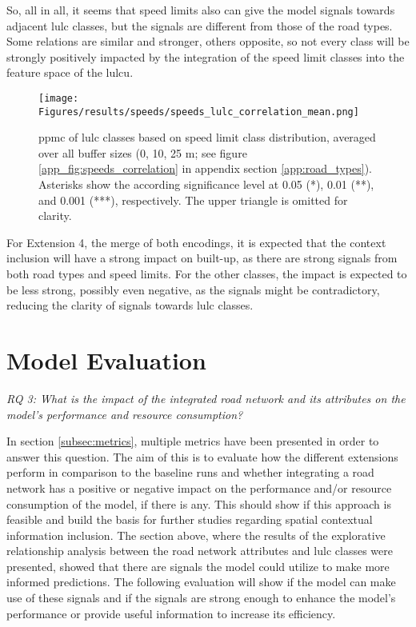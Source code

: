 So, all in all, it seems that speed limits also can give the model signals towards adjacent \gls{lulc} classes, but the signals are different from those of the road types. Some relations are similar and stronger, others opposite, so not every class will be strongly positively impacted by the integration of the speed limit classes into the feature space of the \gls{lulcu}.

\begin{figure}[htb]
    \centering
    \texttt{[image: Figures/results/speeds/speeds\_lulc\_correlation\_mean.png]}
    \caption[ of  Classes Based on Speed Limit Classes]{\gls{ppmc} of \gls{lulc} classes based on speed limit class distribution, averaged over all buffer sizes (0, 10, 25 m; see figure \ref{app_fig:speeds_correlation} in appendix section \ref{app:road_types}). Asterisks show the according significance level at 0.05 (*), 0.01 (**), and 0.001 (***), respectively. The upper triangle is omitted for clarity.}
    \label{fig:pmcc_speeds_mean}
\end{figure}

For Extension 4, the merge of both encodings, it is expected that the context inclusion will have a strong impact on built-up, as there are strong signals from both road types and speed limits. For the other classes, the impact is expected to be less strong, possibly even negative, as the signals might be contradictory, reducing the clarity of signals towards \gls{lulc} classes.

\section{Model Evaluation}

\emph{RQ 3: What is the impact of the integrated road network and its attributes on the model's performance and resource consumption?}

In section \ref{subsec:metrics}, multiple metrics have been presented in order to answer this question. The aim of this is to evaluate how the different extensions perform in comparison to the baseline runs and whether integrating a road network has a positive or negative impact on the performance and/or resource consumption of the model, if there is any. This should show if this approach is feasible and build the basis for further studies regarding spatial contextual information inclusion. The section above, where the results of the explorative relationship analysis between the road network attributes and \gls{lulc} classes were presented, showed that there are signals the model could utilize to make more informed predictions. The following evaluation will show if the model can make use of these signals and if the signals are strong enough to enhance the model's performance or provide useful information to increase its efficiency.

